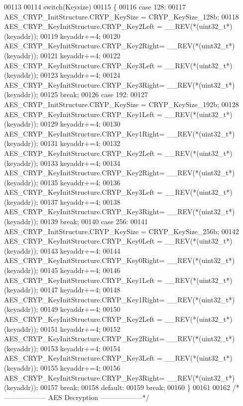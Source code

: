\begin{DoxyCode}
00113 
00114   \textcolor{keywordflow}{switch}(Keysize)
00115   \{
00116     \textcolor{keywordflow}{case} 128:
00117     AES\_CRYP\_InitStructure.CRYP_KeySize = CRYP_KeySize_128b;
00118     AES\_CRYP\_KeyInitStructure.CRYP\_Key2Left = \_\_REV(*(uint32\_t*)(keyaddr));
00119     keyaddr+=4;
00120     AES\_CRYP\_KeyInitStructure.CRYP\_Key2Right= \_\_REV(*(uint32\_t*)(keyaddr));
00121     keyaddr+=4;
00122     AES\_CRYP\_KeyInitStructure.CRYP\_Key3Left = \_\_REV(*(uint32\_t*)(keyaddr));
00123     keyaddr+=4;
00124     AES\_CRYP\_KeyInitStructure.CRYP\_Key3Right= \_\_REV(*(uint32\_t*)(keyaddr));
00125     \textcolor{keywordflow}{break};
00126     \textcolor{keywordflow}{case} 192:
00127     AES\_CRYP\_InitStructure.CRYP_KeySize  = CRYP_KeySize_192b;
00128     AES\_CRYP\_KeyInitStructure.CRYP\_Key1Left = \_\_REV(*(uint32\_t*)(keyaddr));
00129     keyaddr+=4;
00130     AES\_CRYP\_KeyInitStructure.CRYP\_Key1Right= \_\_REV(*(uint32\_t*)(keyaddr));
00131     keyaddr+=4;
00132     AES\_CRYP\_KeyInitStructure.CRYP\_Key2Left = \_\_REV(*(uint32\_t*)(keyaddr));
00133     keyaddr+=4;
00134     AES\_CRYP\_KeyInitStructure.CRYP\_Key2Right= \_\_REV(*(uint32\_t*)(keyaddr));
00135     keyaddr+=4;
00136     AES\_CRYP\_KeyInitStructure.CRYP\_Key3Left = \_\_REV(*(uint32\_t*)(keyaddr));
00137     keyaddr+=4;
00138     AES\_CRYP\_KeyInitStructure.CRYP\_Key3Right= \_\_REV(*(uint32\_t*)(keyaddr));
00139     \textcolor{keywordflow}{break};
00140     \textcolor{keywordflow}{case} 256:
00141     AES\_CRYP\_InitStructure.CRYP_KeySize  = CRYP_KeySize_256b;
00142     AES\_CRYP\_KeyInitStructure.CRYP\_Key0Left = \_\_REV(*(uint32\_t*)(keyaddr));
00143     keyaddr+=4;
00144     AES\_CRYP\_KeyInitStructure.CRYP\_Key0Right= \_\_REV(*(uint32\_t*)(keyaddr));
00145     keyaddr+=4;
00146     AES\_CRYP\_KeyInitStructure.CRYP\_Key1Left = \_\_REV(*(uint32\_t*)(keyaddr));
00147     keyaddr+=4;
00148     AES\_CRYP\_KeyInitStructure.CRYP\_Key1Right= \_\_REV(*(uint32\_t*)(keyaddr));
00149     keyaddr+=4;
00150     AES\_CRYP\_KeyInitStructure.CRYP\_Key2Left = \_\_REV(*(uint32\_t*)(keyaddr));
00151     keyaddr+=4;
00152     AES\_CRYP\_KeyInitStructure.CRYP\_Key2Right= \_\_REV(*(uint32\_t*)(keyaddr));
00153     keyaddr+=4;
00154     AES\_CRYP\_KeyInitStructure.CRYP\_Key3Left = \_\_REV(*(uint32\_t*)(keyaddr));
00155     keyaddr+=4;
00156     AES\_CRYP\_KeyInitStructure.CRYP\_Key3Right= \_\_REV(*(uint32\_t*)(keyaddr));
00157     \textcolor{keywordflow}{break};
00158     \textcolor{keywordflow}{default}:
00159     \textcolor{keywordflow}{break};
00160   \}
00161 
00162   \textcolor{comment}{/*------------------ AES Decryption ------------------*/}

\end{DoxyCode}
